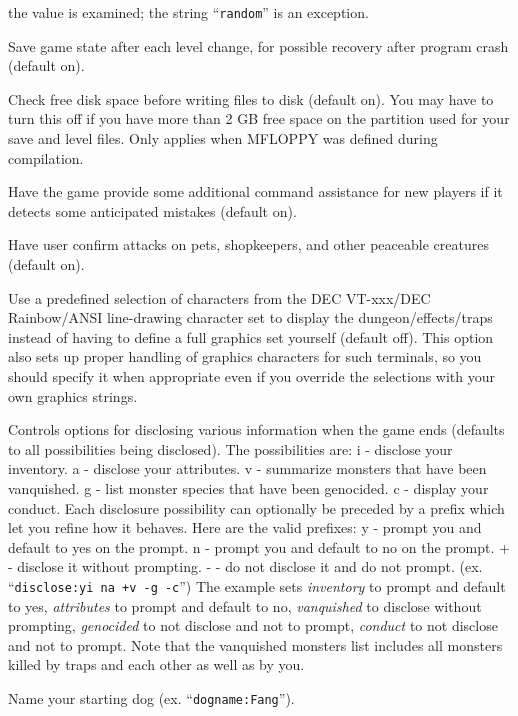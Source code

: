 the value is examined; the string ``{\tt random}'' is an exception.
\item[\tb{checkpoint}]
Save game state after each level change, for possible recovery after
program crash (default on).
\item[\tb{checkspace}]
Check free disk space before writing files to disk (default on).
You may have to turn this off if you have more than 2 GB free space
on the partition used for your save and level files.
Only applies when MFLOPPY was defined during compilation.
\item[\tb{cmdassist}]
Have the game provide some additional command assistance for 
new players if it detects some anticipated mistakes (default on).
\item[\tb{"confirm "}]
Have user confirm attacks on pets, shopkeepers, and other
peaceable creatures (default on).
\item[\tb{DECgraphics}]
Use a predefined selection of characters from the DEC VT-xxx/DEC
Rainbow/ANSI line-drawing character set to display the dungeon/effects/traps
instead of having to define a full graphics set yourself (default off).
This option also sets up proper handling of graphics
characters for such terminals, so you should specify it when appropriate
even if you override the selections with your own graphics strings.
\item[\tb{disclose}]
Controls options for disclosing various information when the game ends (defaults
to all possibilities being disclosed).
The possibilities are:
i - disclose your inventory.
a - disclose your attributes.
v - summarize monsters that have been vanquished.
g - list monster species that have been genocided.
c - display your conduct.
Each disclosure possibility can optionally be preceded by a prefix which
let you refine how it behaves. Here are the valid prefixes:
y - prompt you and default to yes on the prompt.
n - prompt you and default to no on the prompt.
+ - disclose it without prompting.
- - do not disclose it and do not prompt.
(ex. ``{\tt disclose:yi na +v -g -c}'')
The example sets 
{\it inventory }
to prompt and default to yes,
{\it attributes }
to prompt and default to no,
{\it vanquished }
to disclose without prompting,
{\it genocided }
to not disclose and not to prompt,
{\it conduct }
to not disclose and not to prompt.
Note that the vanquished monsters list includes all monsters killed by
traps and each other as well as by you.
\item[\tb{dogname}]
Name your starting dog (ex. ``{\tt dogname:Fang}'').
